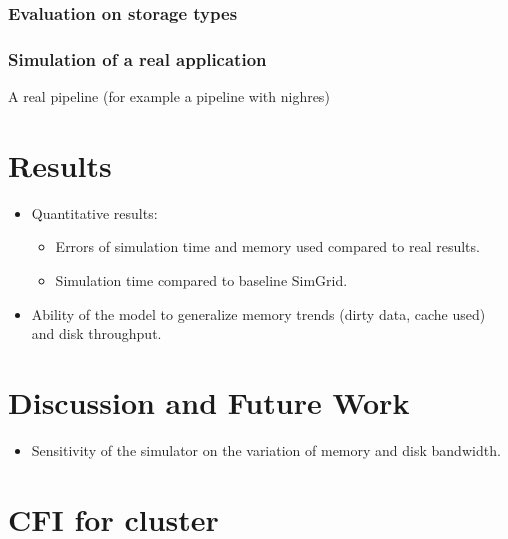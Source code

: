\documentclass[conference]{IEEEtran}
\begin{document}
			\subsubsection{Evaluation on storage types}

				

			\subsubsection{Simulation of a real application}
				A real pipeline (for example a pipeline with nighres)

	\section{Results}
	
		\begin{itemize}

			\item Quantitative results: 
				\begin{itemize}
					\item Errors of simulation time and memory used compared to real results.
					\item Simulation time compared to baseline SimGrid.
				\end{itemize} 

			\item Ability of the model to generalize memory trends (dirty data, cache used) and disk throughput.

		\end{itemize}

	\section{Discussion and Future Work}
		\begin{itemize}
			\item Sensitivity of the simulator on the variation of memory and disk bandwidth. 
		\end{itemize}
	\section{CFI for cluster}


\end{document}
